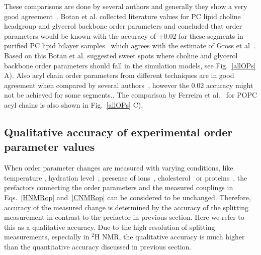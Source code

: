 \documentclass[aps,prl,superscriptaddress,twocolumn]{revtex4}
\begin{document}
These comparisons are done by several authors and generally they show a very good 
agreement~\cite{gross97,dvinskikh05a,ferreira13,botan15,leftin14}.
Botan et al. collected literature values for PC lipid choline headgroup and glycerol backbone order parameters 
and concluded that order parameters would be known with the accuracy of $\pm$0.02 for these segments in 
purified PC lipid bilayer samples~\cite{botan15} which agrees with the estimate of Gross et al~\cite{gross97}. 
Based on this Botan et al. suggested sweet spots where choline and glycerol backbone order parameters should fall in the 
simulation models, see Fig.~\ref{allOPs} A). Also acyl chain order parameters from different techniques 
are in good agreement when compared by several authors~\cite{gross97,dvinskikh05a,ferreira13,leftin14},
however the 0.02 accuracy might not be achieved for some segments..
The comparison by Ferreira et al.~\cite{ferreira13} for POPC acyl chains is also shown in Fig.~\ref{allOPs} C). 







\subsection{Qualitative accuracy of experimental order parameter values}

When order parameter changes are measured with varying conditions, like temperature \cite{seelig74,seelig77,douliez95}, 
hydration level~\cite{bechinger91,ulrich94,mallikarjunaiah11,dvinskikh05a}, presense of ions~\cite{akutsu81,altenbach84,seelig87,scherer89}, 
cholesterol~\cite{brown78,douliez95,ferreira13,leftin14} or proteins~\cite{kuchinka89,roux90,leftin13},
the prefactors connecting the order parameters and the measured couplings in Eqs.~\ref{HNMRop} and~\ref{CNMRop} can be considered 
to be unchanged. Therefore, accuracy of the measured change is determined by the accuracy of the splitting measurement
in contrast to the prefactor in previous section. Here we refer to this as a qualitative accuracy. Due to the high resolution of
splitting measurements, especially in $^2$H NMR, the qualitative accuracy is much higher than the
quantitative accuracy discussed in previous section.
\end{document}
